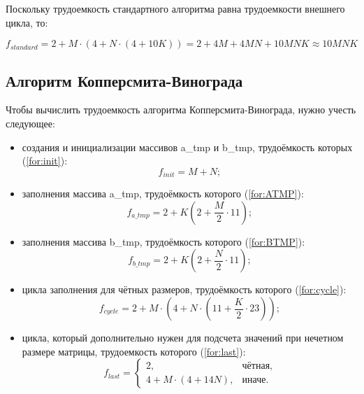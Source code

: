 Поскольку трудоемкость стандартного алгоритма равна трудоемкости внешнего цикла, то:

\begin{equation}
	\label{for:standard}
	f_{standard} = 2 + M \cdot (4 + N \cdot (4 + 10K)) = 2 + 4M + 4MN + 10MNK \approx 10MNK
\end{equation}


\subsection{Алгоритм Копперсмита-Винограда}

Чтобы вычислить трудоемкость алгоритма Копперсмита-Винограда, нужно учесть следующее: 

\begin{itemize}
	\item создания и инициализации массивов a\_tmp и b\_tmp, трудоёмкость которых (\ref{for:init}):
	\begin{equation}
		\label{for:init}
		f_{init} = M + N;
	\end{equation}
	
	\item заполнения массива a\_tmp, трудоёмкость которого (\ref{for:ATMP}):
	\begin{equation}
		\label{for:ATMP}
		f_{a\_tmp} = 2 + K (2 + \frac{M}{2} \cdot 11);
	\end{equation}
	
	\item заполнения массива b\_tmp, трудоёмкость которого (\ref{for:BTMP}):
	\begin{equation}
		\label{for:BTMP}
		f_{b\_tmp} = 2 + K (2 + \frac{N}{2} \cdot 11);
	\end{equation}
	
	\item цикла заполнения для чётных размеров, трудоёмкость которого (\ref{for:cycle}):
	\begin{equation}
		\label{for:cycle}
		f_{cycle} = 2 + M \cdot (4 + N \cdot (11 + \frac{K}{2} \cdot 23));
	\end{equation}
	
	\item цикла, который дополнительно нужен для подсчета значений при нечетном размере матрицы, трудоемкость которого (\ref{for:last}):
	\begin{equation}
		\label{for:last}
		f_{last} = \begin{cases}
			2, & \text{чётная,}\\
			4 + M \cdot (4 + 14N), & \text{иначе.}
		\end{cases}
	\end{equation}
\end{itemize}

